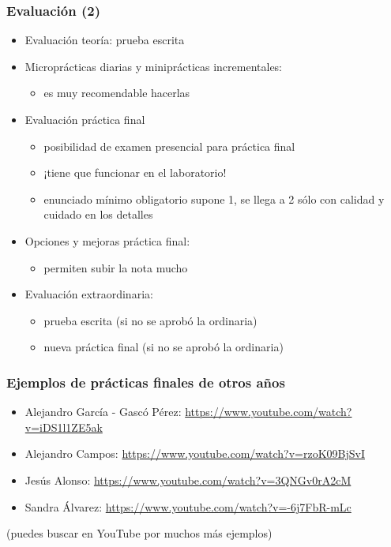 \begin{frame}
\frametitle{Evaluación (2)}

\begin{itemize}
\item Evaluación teoría: prueba escrita
\item Microprácticas diarias y miniprácticas incrementales:
      \begin{itemize}
      \item es muy recomendable hacerlas
      \end{itemize}
\item Evaluación práctica final
      \begin{itemize}
      \item posibilidad de examen presencial para práctica final
      \item ¡tiene que funcionar en el laboratorio!
      \item enunciado mínimo obligatorio supone 1, se llega a 2 sólo con calidad y cuidado en los detalles
      \end{itemize}
\item Opciones y mejoras práctica final:
      \begin{itemize}
      \item permiten subir la nota mucho
      \end{itemize}
\item Evaluación extraordinaria:
  \begin{itemize}
  \item prueba escrita (si no se aprobó la ordinaria)
  \item nueva práctica final (si no se aprobó la ordinaria)
  \end{itemize}
\end{itemize}

\end{frame}


\begin{frame}
\frametitle{Ejemplos de prácticas finales de otros años}

\begin{itemize}
  \item Alejandro García - Gascó Pérez: \url{https://www.youtube.com/watch?v=iDS1l1ZE5ak}
  \item Alejandro Campos: \url{https://www.youtube.com/watch?v=rzoK09BjSvI}
  \item Jesús Alonso: \url{https://www.youtube.com/watch?v=3QNGv0rA2cM}
  \item Sandra Álvarez: \url{https://www.youtube.com/watch?v=-6j7FbR-mLc}
\end{itemize}

(puedes buscar en YouTube por muchos más ejemplos)

\end{frame}



